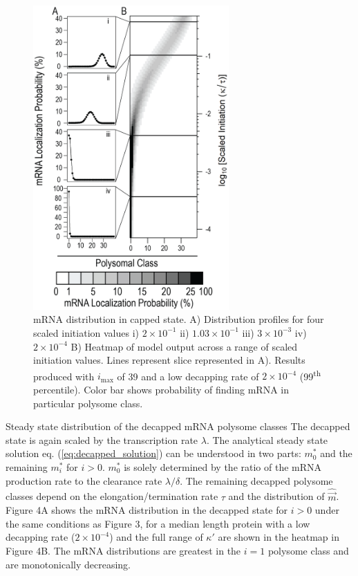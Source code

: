 \documentclass[a4,center,fleqn]{NAR}
\newcommand{\imax}{\ensuremath{{i_{\max}}}\xspace}
\newcommand{\mvec}{\ensuremath{\vec{m}}\xspace}
\newcommand{\mvechat}{\ensuremath{\hat{\mvec}}\xspace}
\begin{document}
\begin{figure}[!ht]
\includegraphics[width=75mm]{Images/2023-07-04_Unmarked_slices.png}
\caption{mRNA distribution in capped state. A) Distribution profiles for four scaled initiation values i) $2\times 10^{-1}$ ii) $1.03\times 10^{-1}$ iii) $3\times 10^{-3}$ iv) $2\times 10^{-4}$ B) Heatmap of model output across a range of scaled initiation values. Lines represent slice represented in A). Results produced with \imax of 39 and a low decapping rate of $2\times10^{-4}$  (99\textsuperscript{th} percentile). Color bar shows probability of finding mRNA in particular polysome class.}
\end{figure}


Steady state distribution of the decapped mRNA polysome classes
The decapped state is again scaled by the transcription rate $\lambda$.
The analytical steady state solution eq. (\ref{eq:decapped_solution}) can be understood in two parts: $m_0^*$ and the remaining $m_i^*$ for $i>0$.
$m_0^*$ is solely determined by the ratio of the mRNA production rate to the clearance rate $\lambda / \delta$.
The remaining decapped polysome classes depend on the elongation/termination rate $\tau$ and the distribution of \mvechat.
 Figure 4A shows the mRNA distribution in the decapped state for $i>0$ under the same conditions as Figure 3, for a median length protein with a low decapping rate ($2\times10^{-4}$) and the full range of $\kappa'$ are shown in the heatmap in Figure 4B.
The mRNA distributions are greatest in the $i=1$ polysome class and are monotonically decreasing. 
 
\end{document}
